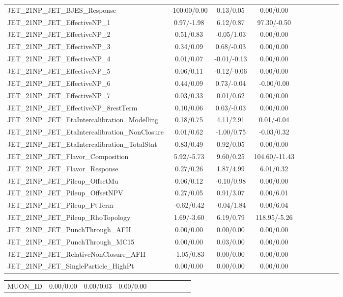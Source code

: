 \begin{table}[h]
\begin{center}
\begin{tabular}{l|ccccccccc}
JET\_21NP\_JET\_BJES\_Response &-100.00/0.00 &0.13/0.05 &0.00/0.00 \\
JET\_21NP\_JET\_EffectiveNP\_1 &0.97/-1.98 &6.12/0.87 &97.30/-0.50 \\
JET\_21NP\_JET\_EffectiveNP\_2 &0.51/0.83 &-0.05/1.03 &0.00/0.00 \\
JET\_21NP\_JET\_EffectiveNP\_3 &0.34/0.09 &0.68/-0.03 &0.00/0.00 \\
JET\_21NP\_JET\_EffectiveNP\_4 &0.01/0.07 &-0.01/-0.13 &0.00/0.00 \\
JET\_21NP\_JET\_EffectiveNP\_5 &0.06/0.11 &-0.12/-0.06 &0.00/0.00 \\
JET\_21NP\_JET\_EffectiveNP\_6 &0.44/0.09 &0.73/-0.04 &-0.00/0.00 \\
JET\_21NP\_JET\_EffectiveNP\_7 &0.03/0.33 &0.01/0.62 &0.00/0.00 \\
JET\_21NP\_JET\_EffectiveNP\_8restTerm &0.10/0.06 &0.03/-0.03 &0.00/0.00 \\
JET\_21NP\_JET\_EtaIntercalibration\_Modelling &0.18/0.75 &4.11/2.91 &0.01/-0.04 \\
JET\_21NP\_JET\_EtaIntercalibration\_NonClosure &0.01/0.62 &-1.00/0.75 &-0.03/0.32 \\
JET\_21NP\_JET\_EtaIntercalibration\_TotalStat &0.83/0.49 &0.92/0.05 &0.00/0.00 \\
JET\_21NP\_JET\_Flavor\_Composition &5.92/-5.73 &9.60/0.25 &104.60/-11.43 \\
JET\_21NP\_JET\_Flavor\_Response &0.27/0.26 &1.87/4.99 &6.01/0.32 \\
JET\_21NP\_JET\_Pileup\_OffsetMu &0.06/0.12 &-0.10/0.98 &0.00/0.00 \\
JET\_21NP\_JET\_Pileup\_OffsetNPV &0.27/0.05 &0.91/3.07 &0.00/6.01 \\
JET\_21NP\_JET\_Pileup\_PtTerm &-0.62/0.42 &-0.04/1.84 &0.00/6.04 \\
JET\_21NP\_JET\_Pileup\_RhoTopology &1.69/-3.60 &6.19/0.79 &118.95/-5.26 \\
JET\_21NP\_JET\_PunchThrough\_AFII &0.00/0.00 &0.00/0.00 &0.00/0.00 \\
JET\_21NP\_JET\_PunchThrough\_MC15 &0.00/0.00 &0.03/0.00 &0.00/0.00 \\
JET\_21NP\_JET\_RelativeNonClosure\_AFII &-1.05/0.83 &0.00/0.00 &0.00/0.00 \\
JET\_21NP\_JET\_SingleParticle\_HighPt &0.00/0.00 &0.00/0.00 &0.00/0.00 \\
\hline \end{tabular} \end{center} \end{table} \begin{table}[h] \scriptsize \begin{center} \begin{tabular}{l|ccccccccc} \hline MUON\_ID &0.00/0.00 &0.00/0.03 &0.00/0.00 \\

\end{tabular}
\end{center}
\end{table}
